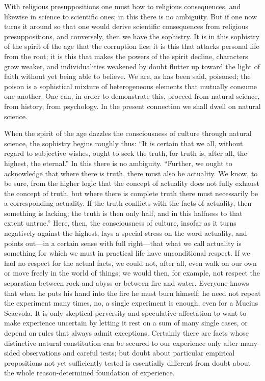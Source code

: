 \documentclass[12pt]{book}
\newcommand{\opage}[1]{\marginnote{\footnotesize\textit{[#1]}}}
\begin{document}
With religious presuppositions one must bow to religious consequences,
and likewise in science to scientific ones; in this there is no
ambiguity. But if one now turns it around so that one would derive
scientific consequences from religious presuppositions, and conversely,
then we have the sophistry. It is in this sophistry of the spirit of
the age that the corruption lies; it is this that attacks personal life
from the root; it is this that makes the powers of the spirit decline,
characters grow weaker, and individualities weakened by doubt flutter
up toward the light of faith without yet being able to
\opage{60}\setcounter{footnote}{0}%
believe. We are, as has been said, poisoned; the poison is a sophistical
mixture of heterogeneous elements that mutually consume one another.
One can, in order to demonstrate this, proceed from natural science,
from history, from psychology. In the present connection we shall dwell
on natural science.

When the spirit of the age dazzles the consciousness of culture through
natural science, the sophistry begins roughly thus: ``It is certain that
we all, without regard to subjective wishes, ought to seek the truth,
for truth is, after all, the highest, the eternal.'' In this there is no
ambiguity. ``Further, we ought to acknowledge that where there is truth,
there must also be actuality. We know, to be sure, from the higher logic
that the concept of actuality does not fully exhaust the concept of
truth, but where there is complete truth there must necessarily be a
corresponding actuality. If the truth conflicts with the facts of
actuality, then something is lacking; the truth is then only half, and
in this halfness to that extent untrue.'' Here, then, the consciousness
of culture, insofar as it turns negatively against the highest, lays a
special stress on the word actuality, and points out---in a certain
sense with full right---that what we call actuality is something for
which we must in practical life have unconditional respect. If we had no
respect for the actual facts, we could not, after all, even walk on our
own or move freely in the world of things; we would then, for example,
not respect the separation between rock and abyss or between fire and
water. Everyone knows that when he puts his hand into the fire he must
burn himself; he need not repeat the experiment many times, no, a single
experiment is enough, even for a Mucius Scaevola. It is only skeptical
perversity and speculative affectation to want to
\opage{61}\setcounter{footnote}{0}%
make experience uncertain by letting it rest on a sum of many single
cases, or depend on rules that always admit exceptions. Certainly there
are facts whose distinctive natural constitution can be secured to our
experience only after many-sided observations and careful tests; but
doubt about particular empirical propositions not yet sufficiently
tested is essentially different from doubt about the whole
reason-determined foundation of experience.
\end{document}
